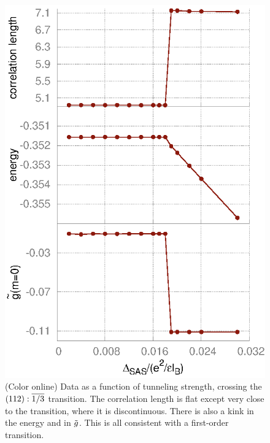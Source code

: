 \begin{figure}%
	\includegraphics[width=0.6\linewidth]{figures/A.eps}
	\caption{\label{Aplots} (Color online) Data as a function of tunneling strength, crossing the $(112):\overline{1/3}$ transition. The correlation length is flat except very close to the transition, where it is discontinuous. There is also a kink in the energy and in ${\tilde g}$. This is all consistent with a first-order transition. }
\end{figure}

